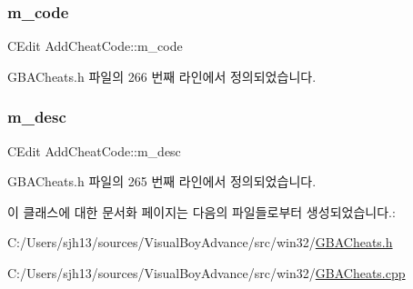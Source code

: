 \subsubsection{\texorpdfstring{m\+\_\+code}{m\_code}}
{\footnotesize\ttfamily C\+Edit Add\+Cheat\+Code\+::m\+\_\+code}



G\+B\+A\+Cheats.\+h 파일의 266 번째 라인에서 정의되었습니다.

\mbox{\label{class_add_cheat_code_a5bbe6b54e71db26da7b3abc7449b3342}} 
\subsubsection{\texorpdfstring{m\+\_\+desc}{m\_desc}}
{\footnotesize\ttfamily C\+Edit Add\+Cheat\+Code\+::m\+\_\+desc}



G\+B\+A\+Cheats.\+h 파일의 265 번째 라인에서 정의되었습니다.



이 클래스에 대한 문서화 페이지는 다음의 파일들로부터 생성되었습니다.\+:\begin{DoxyCompactItemize}
\item 
C\+:/\+Users/sjh13/sources/\+Visual\+Boy\+Advance/src/win32/\mbox{\hyperlink{_g_b_a_cheats_8h}{G\+B\+A\+Cheats.\+h}}\item 
C\+:/\+Users/sjh13/sources/\+Visual\+Boy\+Advance/src/win32/\mbox{\hyperlink{_g_b_a_cheats_8cpp}{G\+B\+A\+Cheats.\+cpp}}\end{DoxyCompactItemize}
